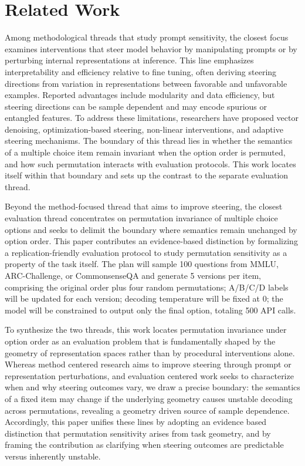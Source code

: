 \section{Related Work}

\label{sec:related-work}


Among methodological threads that study prompt sensitivity, the closest focus examines interventions that steer model behavior by manipulating prompts or by perturbing internal representations at inference. This line emphasizes interpretability and efficiency relative to fine tuning, often deriving steering directions from variation in representations between favorable and unfavorable examples. Reported advantages include modularity and data efficiency, but steering directions can be sample dependent and may encode spurious or entangled features. To address these limitations, researchers have proposed vector denoising, optimization-based steering, non-linear interventions, and adaptive steering mechanisms. The boundary of this thread lies in whether the semantics of a multiple choice item remain invariant when the option order is permuted, and how such permutation interacts with evaluation protocols. This work locates itself within that boundary and sets up the contrast to the separate evaluation thread.


Beyond the method-focused thread that aims to improve steering, the closest evaluation thread concentrates on permutation invariance of multiple choice options and seeks to delimit the boundary where semantics remain unchanged by option order. This paper contributes an evidence-based distinction by formalizing a replication-friendly evaluation protocol to study permutation sensitivity as a property of the task itself. The plan will sample 100 questions from MMLU, ARC-Challenge, or CommonsenseQA and generate 5 versions per item, comprising the original order plus four random permutations; A/B/C/D labels will be updated for each version; decoding temperature will be fixed at 0; the model will be constrained to output only the final option, totaling 500 API calls.


To synthesize the two threads, this work locates permutation invariance under option order as an evaluation problem that is fundamentally shaped by the geometry of representation spaces rather than by procedural interventions alone. Whereas method centered research aims to improve steering through prompt or representation perturbations, and evaluation centered work seeks to characterize when and why steering outcomes vary, we draw a precise boundary: the semantics of a fixed item may change if the underlying geometry causes unstable decoding across permutations, revealing a geometry driven source of sample dependence. Accordingly, this paper unifies these lines by adopting an evidence based distinction that permutation sensitivity arises from task geometry, and by framing the contribution as clarifying when steering outcomes are predictable versus inherently unstable.
